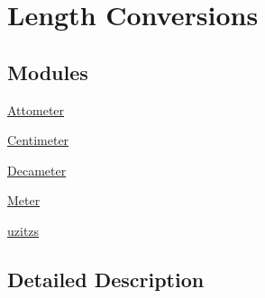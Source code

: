 \hypertarget{group___e_g_x_math-_conversions-_length_conversions}{}\section{Length Conversions}
\label{group___e_g_x_math-_conversions-_length_conversions}
\subsection*{Modules}
\begin{DoxyCompactItemize}
\item 
\mbox{\hyperlink{group___e_g_x_math-_conversions-_length_conversions-_attometer}{Attometer}}
\item 
\mbox{\hyperlink{group___e_g_x_math-_conversions-_length_conversions-_centimeter}{Centimeter}}
\item 
\mbox{\hyperlink{group___e_g_x_math-_conversions-_length_conversions-_decameter}{Decameter}}
\item 
\mbox{\hyperlink{group___e_g_x_math-_conversions-_length_conversions-_meter}{Meter}}
\item 
\mbox{\hyperlink{group___e_g_x_math-_conversions-_length_conversions-uzitzs}{uzitzs}}
\end{DoxyCompactItemize}


\subsection{Detailed Description}
